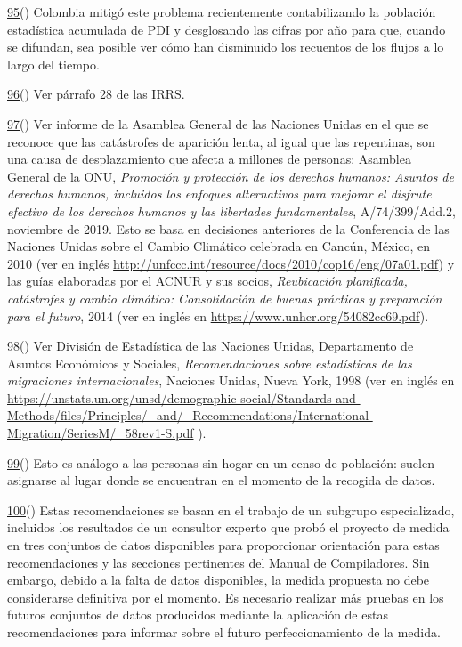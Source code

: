 \documentclass[
]{book}
\begin{document}
\protect\hyperlink{sdfootnote95anc}{95}() Colombia mitigó este problema recientemente contabilizando la población estadística acumulada de PDI y desglosando las cifras por año para que, cuando se difundan, sea posible ver cómo han disminuido los recuentos de los flujos a lo largo del tiempo.

\protect\hyperlink{sdfootnote96anc}{96}() Ver párrafo 28 de las IRRS.

\protect\hyperlink{sdfootnote97anc}{97}() Ver informe de la Asamblea General de las Naciones Unidas en el que se reconoce que las catástrofes de aparición lenta, al igual que las repentinas, son una causa de desplazamiento que afecta a millones de personas: Asamblea General de la ONU, \emph{Promoción y protección de los derechos humanos: Asuntos de derechos humanos, incluidos los enfoques alternativos para mejorar el disfrute efectivo de los derechos humanos y las libertades fundamentales}, A/74/399/Add.2, noviembre de 2019. Esto se basa en decisiones anteriores de la Conferencia de las Naciones Unidas sobre el Cambio Climático celebrada en Cancún, México, en 2010 (ver en inglés \url{http://unfccc.int/resource/docs/2010/cop16/eng/07a01.pdf}) y las guías elaboradas por el ACNUR y sus socios, \emph{Reubicación planificada, catástrofes y cambio climático: Consolidación de buenas prácticas y preparación para el futuro}, 2014 (ver en inglés en \url{https://www.unhcr.org/54082cc69.pdf}).

\protect\hyperlink{sdfootnote98anc}{98}() Ver División de Estadística de las Naciones Unidas, Departamento de Asuntos Económicos y Sociales, \emph{Recomendaciones sobre estadísticas de las migraciones internacionales}, Naciones Unidas, Nueva York, 1998 (ver en inglés en \url{https://unstats.un.org/unsd/demographic-social/Standards-and-Methods/files/Principles/_and/_Recommendations/International-Migration/SeriesM/_58rev1-S.pdf} ).

\protect\hyperlink{sdfootnote99anc}{99}() Esto es análogo a las personas sin hogar en un censo de población: suelen asignarse al lugar donde se encuentran en el momento de la recogida de datos.

\protect\hyperlink{sdfootnote100anc}{100}() Estas recomendaciones se basan en el trabajo de un subgrupo especializado, incluidos los resultados de un consultor experto que probó el proyecto de medida en tres conjuntos de datos disponibles para proporcionar orientación para estas recomendaciones y las secciones pertinentes del Manual de Compiladores. Sin embargo, debido a la falta de datos disponibles, la medida propuesta no debe considerarse definitiva por el momento. Es necesario realizar más pruebas en los futuros conjuntos de datos producidos mediante la aplicación de estas recomendaciones para informar sobre el futuro perfeccionamiento de la medida.
\end{document}
